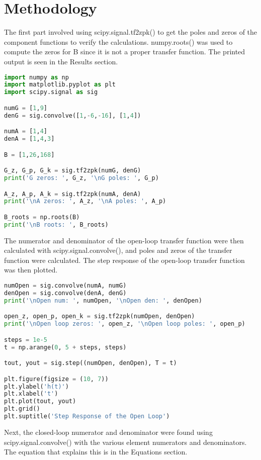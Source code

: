 \documentclass[12pt]{report}
\begin{document}
\section{Methodology}
The first part involved using scipy.signal.tf2zpk() to get the poles and zeros of the component functions to verify the calculations. numpy.roots() was used to compute the zeros for B since it is not a proper transfer function. The printed output is seen in the Results section.
\begin{lstlisting}[language=Python, caption=Poles and zeros of the components]
import numpy as np
import matplotlib.pyplot as plt
import scipy.signal as sig

numG = [1,9]
denG = sig.convolve([1,-6,-16], [1,4])

numA = [1,4]
denA = [1,4,3]

B = [1,26,168]

G_z, G_p, G_k = sig.tf2zpk(numG, denG)
print('G zeros: ', G_z, '\nG poles: ', G_p)

A_z, A_p, A_k = sig.tf2zpk(numA, denA)
print('\nA zeros: ', A_z, '\nA poles: ', A_p)

B_roots = np.roots(B)
print('\nB roots: ', B_roots)

\end{lstlisting}

The numerator and denominator of the open-loop transfer function were then calculated with scipy.signal.convolve(), and poles and zeros of the transfer function were calculated. The step response of the open-loop transfer function was then plotted.

\begin{lstlisting}[language=Python, caption=Open-loop transfer function calculation and poles and zeros]
numOpen = sig.convolve(numA, numG)
denOpen = sig.convolve(denA, denG)
print('\nOpen num: ', numOpen, '\nOpen den: ', denOpen)

open_z, open_p, open_k = sig.tf2zpk(numOpen, denOpen)
print('\nOpen loop zeros: ', open_z, '\nOpen loop poles: ', open_p)

steps = 1e-5
t = np.arange(0, 5 + steps, steps)

tout, yout = sig.step((numOpen, denOpen), T = t)

plt.figure(figsize = (10, 7))
plt.ylabel('h(t)')
plt.xlabel('t')
plt.plot(tout, yout)
plt.grid()
plt.suptitle('Step Response of the Open Loop')
\end{lstlisting}

Next, the closed-loop numerator and denominator were found using scipy.signal.convolve() with the various element numerators and denominators. The equation that explains this is in the Equations section. 
\end{document}
